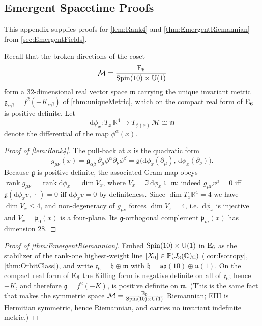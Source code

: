 \documentclass[pdflatex,sn-mathphys-num]{sn-jnl}
\theoremstyle{thmstyleone}
\theoremstyle{thmstylethree}%
\theoremstyle{thmstyletwo}%
\begin{document}
\begin{appendices}


\appendix

\section{Emergent Spacetime Proofs}
\label{app:Lorentz}

This appendix supplies proofs for \autoref{lem:Rank4} and \autoref{thm:EmergentRiemannian} from \autoref{sec:EmergentFields}.

Recall that the broken directions of the coset
\[
    \mathcal{M} = \frac{\mathrm{E}_{6}}{\operatorname{Spin}(10) \times \mathrm{U(1)}}
\]
form a $32$-dimensional real vector space
\(\mathfrak m\) carrying the unique invariant metric
\(\mathfrak g_{\alpha\beta}=f^{2}(-K_{\alpha\beta})\) of
\autoref{thm:uniqueMetric}, which on the compact real form of \(\mathrm{E}_{6}\) is
positive definite. Let
\[
  \mathrm d\phi_x:
  T_x\, \mathbb R^{4}\to T_{\phi(x)}\, \mathcal M
  \cong\mathfrak m
\]
denote the differential of the map
\(\phi^\alpha(x)\).

\begin{proof}[Proof of \autoref{lem:Rank4}]
The pull-back at \(x\) is the quadratic form
\[
  g_{\mu\nu}(x)
  =\mathfrak g_{\alpha\beta}\,\partial_\mu\phi^{\alpha}\partial_\nu\phi^{\beta}
  =\mathfrak g\bigl(\mathrm d\phi_x(\partial_\mu),\,
          \mathrm d\phi_x(\partial_\nu)\bigr).
\]
Because \(\mathfrak g\) is positive definite, the associated Gram map obeys
\(\operatorname{rank} g_{\mu\nu}=\operatorname{rank}\mathrm d\phi_x=\dim
V_x\), where \(V_x=\Im\,\mathrm d\phi_x\subseteq\mathfrak m\): indeed
\(g_{\mu\nu}v^{\mu}=0\) iff \(\mathfrak g(\mathrm d\phi_x v,\,\cdot\,)=0\)
iff \(\mathrm d\phi_x v=0\) by definiteness. Since
\(\dim T_x\mathbb R^{4}=4\) we have \(\dim V_x\le4\), and non-degeneracy of
\(g_{\mu\nu}\) forces \(\dim V_x=4\), i.e.\ \(\mathrm d\phi_x\) is injective and
\(V_x=\mathfrak p_{0}(x)\) is a four-plane. Its \(\mathfrak g\)-orthogonal
complement \(\mathfrak p_{m}(x)\) has dimension \(28\).
\end{proof}

\begin{proof}[Proof of \autoref{thm:EmergentRiemannian}]
Embed \(\operatorname{Spin}(10) \times \mathrm{U(1)}\) in \(\mathrm{E}_{6}\) as the stabilizer of the rank-one
highest-weight line \([X_{0}]\in\mathbb P(J_3(\mathbb{O})_{\mathbb C})\)
(\autoref{cor:Isotropy}, \autoref{thm:OrbitClass}), and write
\(\mathfrak e_{6}=\mathfrak h\oplus\mathfrak m\) with
\(\mathfrak h=\mathfrak{so}(10)\oplus\mathfrak u(1)\). On the compact
real form of \(\mathrm{E}_{6}\) the Killing form is negative definite on all of
\(\mathfrak e_{6}\); hence \(-K\), and therefore
\(\mathfrak g=f^{2}(-K)\), is positive definite on \(\mathfrak m\). (This
is the same fact that makes the symmetric space
\(\mathcal{M}=\frac{\mathrm{E}_{6}}{\operatorname{Spin}(10) \times \mathrm{U(1)}}\) Riemannian; EIII is Hermitian symmetric, hence Riemannian, and
carries no invariant indefinite metric.)


\end{proof}
\end{appendices}
\end{document}
